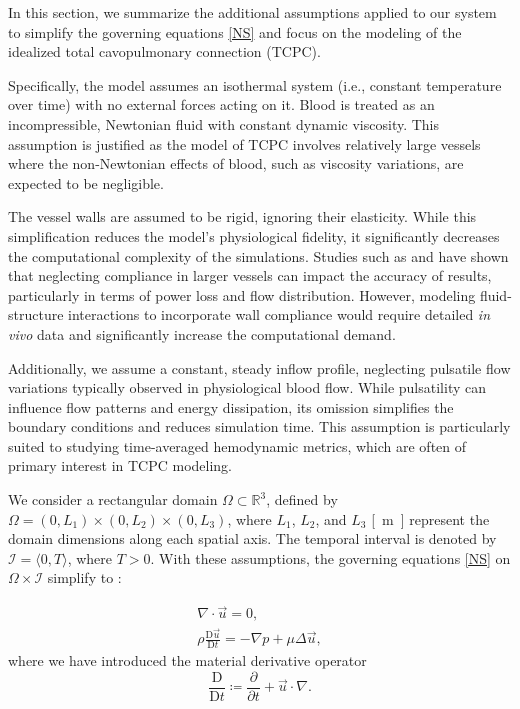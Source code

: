 
In this section, we summarize the additional assumptions applied to our system to simplify the governing equations \eqref{NS} and focus on the modeling of the idealized total cavopulmonary connection (TCPC).

Specifically, the model assumes an isothermal system (i.e., constant temperature over time) with no external forces acting on it. Blood is treated as an incompressible, Newtonian fluid with constant dynamic viscosity. This assumption is justified as the model of TCPC involves relatively large vessels where the non-Newtonian effects of blood, such as viscosity variations, are expected to be negligible.

The vessel walls are assumed to be rigid, ignoring their elasticity. While this simplification reduces the model's physiological fidelity, it significantly decreases the computational complexity of the simulations. 
Studies such as \cite{Masters2004} and \cite{Orlando2006} have shown that neglecting compliance in larger vessels can impact the accuracy of results, particularly in terms of power loss and flow distribution. However, modeling fluid-structure interactions to incorporate wall compliance would require detailed \textit{in vivo} data and significantly increase the computational demand.

Additionally, we assume a constant, steady inflow profile, neglecting pulsatile flow variations typically observed in physiological blood flow. While pulsatility can influence flow patterns and energy dissipation, its omission simplifies the boundary conditions and reduces simulation time. This assumption is particularly suited to studying time-averaged hemodynamic metrics, which are often of primary interest in TCPC modeling.

We consider a rectangular domain $ \Omega \subset \mathbb{R}^3 $, defined by $ \Omega = (0, L_1) \times (0, L_2) \times (0, L_3) $, where $ L_1 $, $ L_2 $, and $ L_3 $ \si{[m]} represent the domain dimensions along each spatial axis. The temporal interval is denoted by $ \mathcal{I} = \langle 0, T \rangle $, where $ T > 0 $. With these assumptions, the governing equations \eqref{NS} on $ \Omega \times \mathcal{I} $ simplify to \cite{Schlichting}:

\begin{subequations}\label{NS s predpoklady}
	\begin{gather}
		\label{a s predpoklady}
		\nabla \cdot \vec{u} = 0, \\[5pt]
		\label{b s predpoklady}
		\rho \frac{\text{D} \vec{u}}{\text{D} t} = - \nabla p + \mu \Delta \vec{u},
	\end{gather}
\end{subequations}
where we have introduced the material derivative operator
\begin{equation}
	\dfrac{\text{D}}{\text{D} t} \coloneqq \dfrac{\partial}{\partial t} + \vec{u} \cdot \nabla.
\end{equation}

